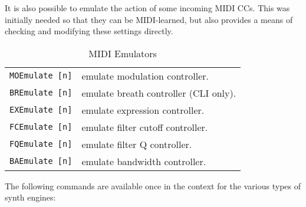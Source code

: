    It is also possible to emulate the action of some incoming MIDI CCs. This
   was initially needed so that they can be MIDI-learned, but also provides
   a means of checking and modifying these settings directly.

   \begin{table}[H]
      \centering
      \caption{MIDI Emulators}
      \label{table:yoshimi_part_midi_emulators}
      \begin{tabular}{l l}
\texttt{MOEmulate [n]} &
   emulate modulation controller. \\
\texttt{BREmulate [n]} &
   emulate breath controller (CLI only). \\
\texttt{EXEmulate [n]} &
   emulate expression controller. \\
\texttt{FCEmulate [n]} &
   emulate filter cutoff controller. \\
\texttt{FQEmulate [n]} &
   emulate filter Q controller. \\
\texttt{BAEmulate [n]} &
   emulate bandwidth controller. \\
      \end{tabular}
   \end{table}

   The following commands are available once in the context for the various
   types of synth engines:


